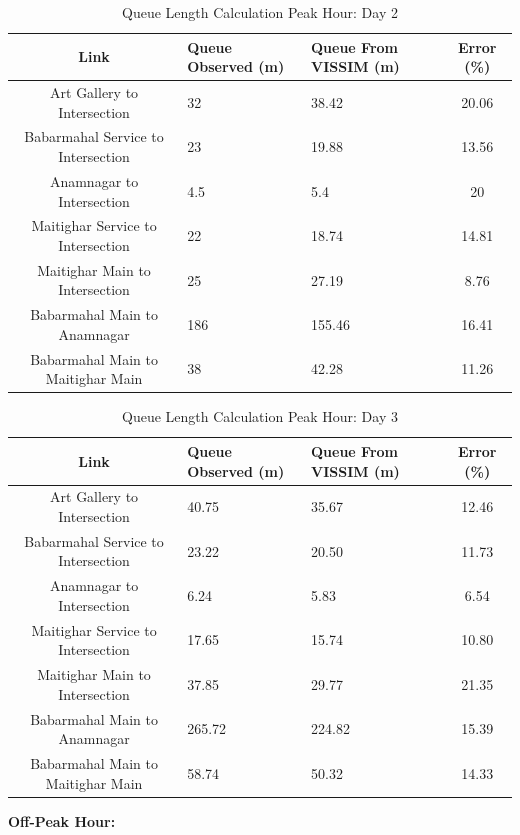 \begin{table}[h!]
\centering
\caption{Queue Length Calculation Peak Hour: Day 2}
\begin{tabular}{|c|p{2cm}|p{2cm}|c|}
\hline
Link & Queue Observed (m) & Queue From VISSIM (m) & Error (\%) \\
\hline
Art Gallery to Intersection & 32 & 38.42 & 20.06 \\ \hline
Babarmahal Service to Intersection & 23 & 19.88 & 13.56 \\ \hline
Anamnagar to Intersection & 4.5 & 5.4 & 20 \\ \hline
Maitighar Service to Intersection & 22 & 18.74 & 14.81 \\ \hline
Maitighar Main to Intersection & 25 & 27.19 & 8.76 \\ \hline
Babarmahal Main to Anamnagar & 186 & 155.46 & 16.41 \\ \hline
Babarmahal Main to Maitighar Main & 38 & 42.28 & 11.26 \\ \hline
\end{tabular}
\end{table}

\begin{table}[h!]
\centering
\caption{Queue Length Calculation Peak Hour: Day 3}
\begin{tabular}{|c|p{2cm}|p{2cm}|c|}
\hline
Link & Queue Observed (m) & Queue From VISSIM (m) & Error (\%) \\
\hline
Art Gallery to Intersection & 40.75 & 35.67 & 12.46 \\ \hline
Babarmahal Service to Intersection & 23.22 & 20.50 & 11.73 \\ \hline
Anamnagar to Intersection & 6.24 & 5.83 & 6.54 \\ \hline
Maitighar Service to Intersection & 17.65 & 15.74 & 10.80 \\ \hline
Maitighar Main to Intersection & 37.85 & 29.77 & 21.35 \\ \hline
Babarmahal Main to Anamnagar & 265.72 & 224.82 & 15.39 \\ \hline
Babarmahal Main to Maitighar Main & 58.74 & 50.32 & 14.33 \\ \hline
\end{tabular}
\end{table}

\pagebreak
\textbf{Off-Peak Hour:}

